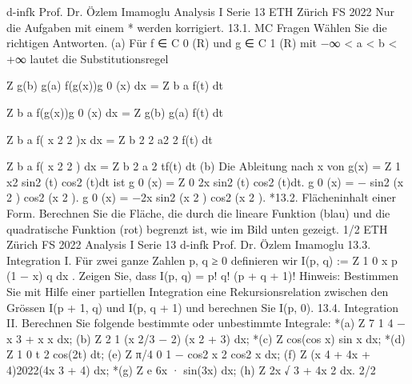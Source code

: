 d-infk
Prof. Dr. Özlem Imamoglu
Analysis I
Serie 13
ETH Zürich
FS 2022
Nur die Aufgaben mit einem * werden korrigiert.
13.1. MC Fragen Wählen Sie die richtigen Antworten.
(a) Für f ∈ C
0
(R) und g ∈ C
1
(R) mit −∞ < a < b < +∞ lautet die Substitutionsregel

Z g(b)
g(a)
f(g(x))g
0
(x) dx =
Z b
a
f(t) dt

Z b
a
f(g(x))g
0
(x) dx =
Z g(b)
g(a)
f(t) dt

Z b
a
f(
x
2
2
)x dx =
Z b
2
2
a2
2
f(t) dt

Z b
a
f(
x
2
2
) dx =
Z b
2
a
2
tf(t) dt
(b) Die Ableitung nach x von g(x) = Z 1
x2
sin2
(t) cos2
(t)dt ist
 g
0
(x) = Z 0
2x
sin2
(t) cos2
(t)dt.
 g
0
(x) = − sin2
(x
2
) cos2
(x
2
).
 g
0
(x) = −2x sin2
(x
2
) cos2
(x
2
).
*13.2. Flächeninhalt einer Form. Berechnen Sie die Fläche, die durch die lineare
Funktion (blau) und die quadratische Funktion (rot) begrenzt ist, wie im Bild unten
gezeigt.
1/2       
ETH Zürich
FS 2022
Analysis I
Serie 13
d-infk
Prof. Dr. Özlem Imamoglu
13.3. Integration I. Für zwei ganze Zahlen p, q ≥ 0 definieren wir
I(p, q) := Z 1
0
x
p
(1 − x)
q
dx .
Zeigen Sie, dass
I(p, q) = p! q!
(p + q + 1)!
Hinweis: Bestimmen Sie mit Hilfe einer partiellen Integration eine Rekursionsrelation
zwischen den Grössen I(p + 1, q) und I(p, q + 1) und berechnen Sie I(p, 0).
13.4. Integration II. Berechnen Sie folgende bestimmte oder unbestimmte Integrale:
*(a) Z 7
1
4 − x
3 + x
x
dx; (b) Z 2
1
(x
2/3 − 2) (x
2 + 3) dx;
*(c) Z
cos(cos x) sin x dx; *(d) Z 1
0
t
2
cos(2t) dt;
(e) Z π/4
0
1 − cos2 x
2 cos2 x
dx; (f) Z
(x
4 + 4x + 4)2022(4x
3 + 4) dx;
*(g) Z
e
6x
· sin(3x) dx; (h) Z
2x
√
3 + 4x
2
dx.
2/2

